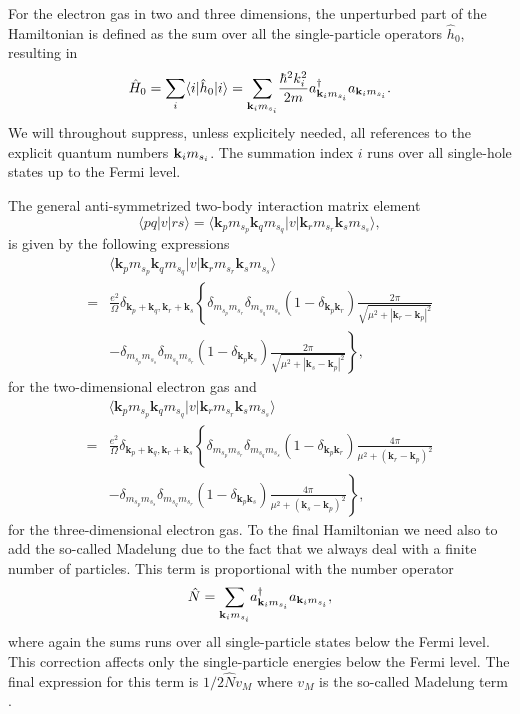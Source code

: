 \documentclass[aps,twocolumn,showpacs,floatfix,nofootinbib,preprintnumbers,superscriptaddress,amsmath,amssymb]{revtex4-1}
\begin{document}
For the electron gas in two and three dimensions, the unperturbed part of the Hamiltonian is defined as the sum over all 
the single-particle operators $\hat{h}_0$, resulting in
\[
\hat{H}_{0}=\sum_i\langle i|\hat{h}_0|i \rangle= {\displaystyle\sum_{{\bf k}_{i}m_{s_i}}}
\frac{\hbar^{2}k_i^{2}}{2m}a_{{\bf k}_{i}m_{s_i}}^{\dagger}
a_{{\bf k}_{i}m_{s_i}}.
\]
We will throughout suppress, unless explicitely needed, all references to the explicit quantum numbers 
${\bf k}_{i}m_{s_i}$. The summation index $i$ runs over all single-hole states up to the Fermi level.

The general anti-symmetrized two-body interaction matrix element
\[
\langle pq |v| r s \rangle  = \langle \mathbf{k}_{p}m_{s_{p}}\mathbf{k}_{q}m_{s_{q}}|v|\mathbf{k}_{r}m_{s_{r}}\mathbf{k}_{s}m_{s_{s}}\rangle,
\]
is given by the following expressions 
\begin{align}
     & \langle \mathbf{k}_{p}m_{s_{p}}\mathbf{k}_{q}m_{s_{q}}|v|\mathbf{k}_{r}m_{s_{r}}\mathbf{k}_{s}m_{s_{s}}\rangle \nonumber \\
     =& \frac{e^{2}}{\Omega}\delta_{\mathbf{k}_{p}+\mathbf{k}_{q}, \mathbf{k}_{r}+\mathbf{k}_{s}}\left\{ \delta_{m_{s_{p}}m_{s_{r}}}\delta_{m_{s_{q}}m_{s_{s}}}(1-\delta_{\mathbf{k}_{p}\mathbf{k}_{r}})\frac{2\pi }{\sqrt{\mu^{2} + |\mathbf{k}_{r}-\mathbf{k}_{p}|^{2}}} \right. \nonumber \\
     & \left. - \delta_{m_{s_{p}}m_{s_{s}}}\delta_{m_{s_{q}}m_{s_{r}}}(1-\delta_{\mathbf{k}_{p}\mathbf{k}_{s}})\frac{2\pi }{\sqrt{\mu^{2} + |\mathbf{k}_{s}-\mathbf{k}_{p}|^{2}}} \right\}, \nonumber
   \end{align}
for the two-dimensional electron gas and
  \begin{align}
    & \langle \mathbf{k}_{p}m_{s_{p}}\mathbf{k}_{q}m_{s_{q}}|v|\mathbf{k}_{r}m_{s_{r}}\mathbf{k}_{s}m_{s_{s}}\rangle \nonumber \\
    =& \frac{e^{2}}{\Omega}\delta_{\mathbf{k}_{p}+\mathbf{k}_{q}, \mathbf{k}_{r}+\mathbf{k}_{s}}\left\{ \delta_{m_{s_{p}}m_{s_{r}}}\delta_{m_{s_{q}}m_{s_{s}}}(1-\delta_{\mathbf{k}_{p}\mathbf{k}_{r}})\frac{4\pi }{\mu^{2} + (\mathbf{k}_{r}-\mathbf{k}_{p})^{2}} \right. \nonumber \\
     & \left. - \delta_{m_{s_{p}}m_{s_{s}}}\delta_{m_{s_{q}}m_{s_{r}}}(1-\delta_{\mathbf{k}_{p}\mathbf{k}_{s}})\frac{4\pi }{\mu^{2} + (\mathbf{k}_{s}-\mathbf{k}_{p})^{2}} \right\}, \nonumber
  \end{align}
for the three-dimensional electron gas. To the final Hamiltonian we need also to add the so-called Madelung due to  the fact that we always deal with a finite number of particles. This term is proportional with the number operator 
\[
\hat{N}={\displaystyle\sum_{{\bf k}_im_{s_i}}}a_{{\bf k}_im_{s_i}}^{\dagger}a_{{\bf k}_im_{s_i}},
\]
where again the sums runs over all single-particle states below the Fermi level. 
This correction affects only the single-particle energies below the Fermi level. The final expression for this term is
$1/2\hat{N}v_M$
where $v_M$ is the so-called Madelung term \cite{fetter}. 
\end{document}
